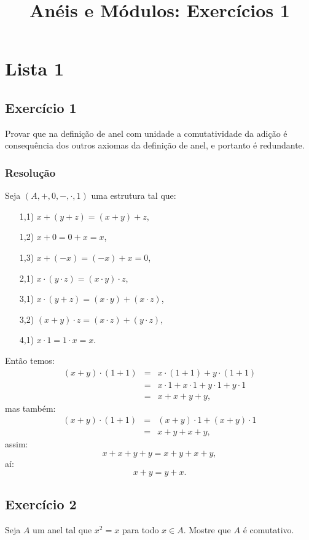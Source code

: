 \documentclass[10pt,a4paper]{article}
\title{Anéis e Módulos: Exercícios 1}
\author{}
\date{}
\begin{document}
\maketitle

\newpage

\section*{Lista 1}

\subsection*{Exercício 1}
Provar que na definição de anel com unidade a comutatividade da adição é consequência dos outros axiomas da definição de anel, e portanto é redundante.

\subsubsection*{Resolução}

Seja $(A,+,0,-,\cdot,1)$ uma estrutura tal que:
\begin{itemize}
\item[1,1)] $x+(y+z)=(x+y)+z$,
\item[1,2)] $x+0=0+x=x$,
\item[1,3)] $x+(-x)=(-x)+x=0$,
\item[2,1)] $x\cdot(y\cdot z)=(x\cdot y)\cdot z$,
\item[3,1)] $x\cdot(y+z)=(x\cdot y)+(x\cdot z)$,
\item[3,2)] $(x+y)\cdot z=(x\cdot z)+(y\cdot z)$,
\item[4,1)] $x\cdot 1=1\cdot x=x$.
\end{itemize}
Então temos:
\[
\begin{array}{rcl}
(x+y)\cdot(1+1)&=& x\cdot(1+1)+y\cdot(1+1)\\&=&x\cdot 1+x\cdot 1+y\cdot 1+y\cdot 1\\&=&x+x+y+y,
\end{array}
\]
mas também:
\[
\begin{array}{rcl}
(x+y)\cdot(1+1)&=& (x+y)\cdot 1+(x+y)\cdot 1\\&=&x+y+x+y,
\end{array}
\]
assim:
\[
x+x+y+y=x+y+x+y,
\]
aí:
\[
x+y=y+x.
\]

\newpage

\subsection*{Exercício 2}
Seja $A$ um anel tal que $x^2=x$ para todo $x\in A$. Mostre que $A$ é comutativo.
\end{document}
